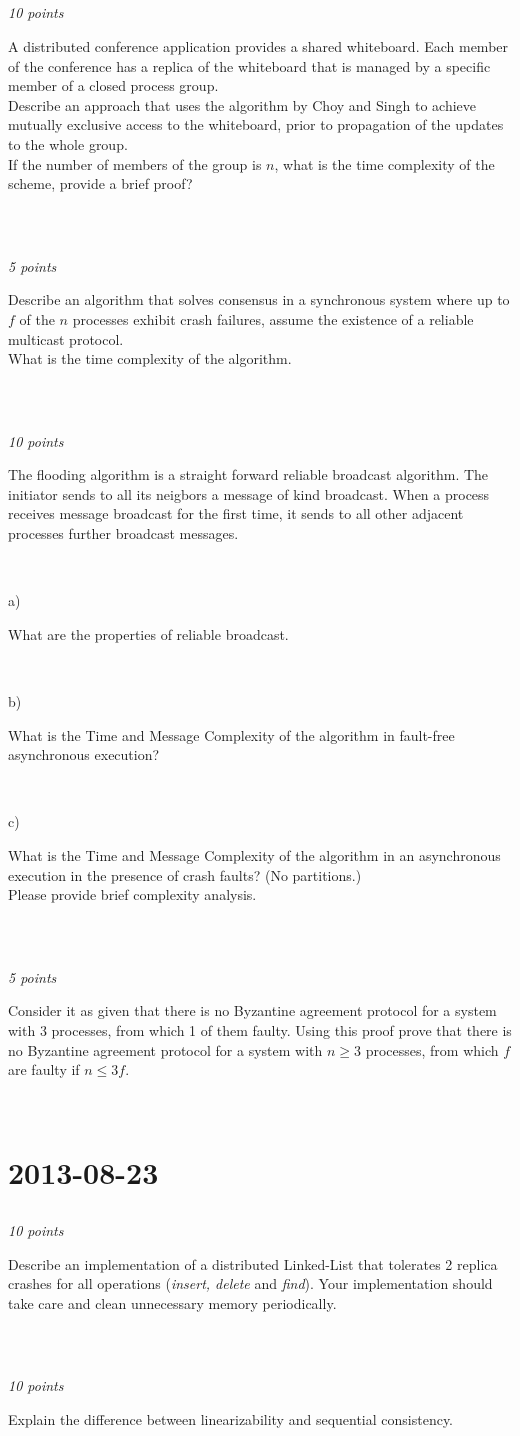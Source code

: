 \documentclass[a4paper]{article}
\newcommand{\points}[1]{\subsection{} \textit{#1 points}\\}
\newcommand{\question}[2][]{
  \noindent
  \parbox[t]{\textwidth}{#1 \parbox[t]{0.95\textwidth}{#2}}\\
}
\begin{document}
\points{10}
\question{A distributed conference application provides a shared
  whiteboard. Each member of the conference has a replica of the
  whiteboard that is managed by a specific member of a closed process
  group. \\
  Describe an approach that uses the algorithm by Choy and Singh to
  achieve mutually exclusive access to the whiteboard, prior to
  propagation of the updates to the whole group. \\
  If the number of members of the group is $n$, what is the time
  complexity of the scheme, provide a brief proof?}

\points{5}
\question{Describe an algorithm that solves consensus in a synchronous
  system where up to $f$ of the $n$ processes exhibit crash failures,
  assume the existence of a reliable multicast protocol. \\
  What is the time complexity of the algorithm.}

\points{10}
\question{The flooding algorithm is a straight forward reliable
  broadcast algorithm. The initiator sends to all its neigbors a
  message of kind broadcast. When a process receives message broadcast
  for the first time, it sends to all other adjacent processes
  further broadcast messages.}
\question[a)]{What are the properties of reliable broadcast.}
\question[b)]{What is the Time and Message Complexity of the algorithm
  in fault-free asynchronous execution?}
\question[c)]{What is the Time and Message Complexity of the algorithm
  in an asynchronous execution in the presence of crash faults? (No
  partitions.) \\
  Please provide brief complexity analysis.}

\points{5}
\question{Consider it as given that there is no Byzantine agreement
  protocol for a system with 3 processes, from which 1 of them
  faulty. Using this proof prove that there is no Byzantine agreement
  protocol for a system with $n \geq 3$ processes, from which $f$ are
  faulty if $n \leq 3f$.}


\section{2013-08-23}
\points{10}
\question{Describe an implementation of a distributed Linked-List that tolerates 2 replica crashes for all operations (\textit{insert, delete} and \textit{find}). Your implementation should take care and clean unnecessary memory periodically.}

\points{10}
\question{Explain the difference between linearizability and sequential consistency.}
\end{document}
